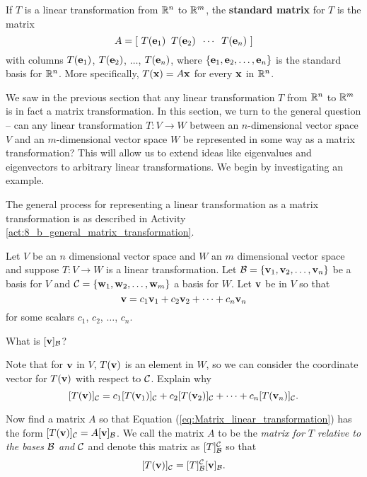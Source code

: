 \begin{definition} If $T$ is a linear transformation from $\mathbb{R}^n$ to $\mathbb{R}^m$, the \textbf{standard matrix} for $T$ is the matrix  
\[A= [ \ T(\mathbf{e}_1) \;\;  T(\mathbf{e}_2)  \;\; \cdots \;\;  T(\mathbf{e}_n) \ ]\]
with columns $T(\mathbf{e}_1)$, $T(\mathbf{e}_2)$, $\ldots$, $T(\mathbf{e}_n)$, where $\{\mathbf{e}_1, \mathbf{e}_2, \ldots, \mathbf{e}_n\}$ is the standard basis for $\mathbb{R}^n$. More specifically, $T(\mathbf{x})=A\mathbf{x}$ for every $\mathbf{x}$ in $\mathbb{R}^n$. 
 \end{definition}


\label{sec:mtx_lin_trans}

We saw in the previous section that any linear transformation $T$ from $\mathbb{R}^n$ to $\mathbb{R}^m$ is in fact a matrix transformation. In this section, we turn to the general question -- can any linear transformation $T: V \to W$ between an $n$-dimensional vector space $V$ and an $m$-dimensional vector space $W$ be represented in some way as a matrix transformation? This will allow us to extend ideas like eigenvalues and eigenvectors to arbitrary linear transformations. We begin by investigating an example.



The general process for representing a linear transformation as a matrix transformation is as described in Activity \ref{act:8_b_general_matrix_transformation}. 


\begin{activity} \label{act:8_b_general_matrix_transformation} Let $V$ be an $n$ dimensional vector space and $W$ an $m$ dimensional vector space and suppose $T : V \to W$ is a linear transformation. Let $\mathcal{B} = \{\mathbf{v}_1, \mathbf{v}_2, \ldots, \mathbf{v}_n\}$ be a basis for $V$ and $\mathcal{C} = \{\mathbf{w}_1, \mathbf{w}_2, \ldots, \mathbf{w}_m\}$ a basis for $W$. Let $\mathbf{v}$ be in $V$ so that 
\[\mathbf{v} = c_1\mathbf{v}_1 + c_2 \mathbf{v}_2 + \cdots + c_n \mathbf{v}_n\]
for some scalars $c_1$, $c_2$, $\ldots$, $c_n$. 
	\ba
	\item What is $[\mathbf{v}]_{\mathcal{B}}$?
	
	\item Note that for $\mathbf{v}$ in $V$, $T(\mathbf{v})$ is an element in $W$, so we can consider the coordinate vector for $T(\mathbf{v})$ with respect to $\mathcal{C}$. Explain why 
\begin{equation} \label{eq:Matrix_linear_transformation}
[T(\mathbf{v})]_{\mathcal{C}} = c_1[T(\mathbf{v}_1)]_{\mathcal{C}} + c_2 [T(\mathbf{v}_2)]_{\mathcal{C}} + \cdots + c_n [T(\mathbf{v}_n)]_{\mathcal{C}}.
\end{equation}


	\item Now find a matrix $A$ so that Equation (\ref{eq:Matrix_linear_transformation}) has the form $[T(\mathbf{v})]_{\mathcal{C}} = A [\mathbf{v}]_{\mathcal{B}}$. We call the matrix $A$ to be the \emph{matrix for $T$ relative to the bases $\mathcal{B}$ and $\mathcal{C}$} and denote this matrix as $[T]_{\mathcal{B}}^{\mathcal{C}}$ so that
\[[T(\mathbf{v})]_{\mathcal{C}} = [T]_{\mathcal{B}}^{\mathcal{C}} [\mathbf{v}]_{\mathcal{B}}.\]

	\ea

\end{activity}


